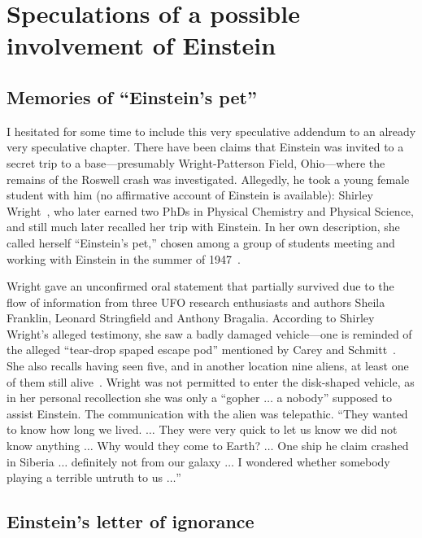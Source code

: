 \section{Speculations of a possible involvement of Einstein}
\label{2023-UFO-part-Perception-crash-retreivals-einstein}

\subsection{Memories of ``Einstein's pet''}

I hesitated for some time to include this very speculative addendum to an already very speculative chapter.
There have been claims that Einstein was invited to a secret trip to a base---presumably Wright-Patterson Field, Ohio---where
the remains of the Roswell crash was investigated.
Allegedly, he took a young female student with him (no affirmative account of Einstein is available):
Shirley Wright~\cite{ShirleyWrightObituaryLegacy2015Jul}, who later earned two PhDs in Physical Chemistry and Physical Science,
and still much later recalled her trip with Einstein.
In her own description, she
called herself ``Einstein's pet,''
chosen among a group of students meeting and working with Einstein in the summer of 1947~\cite{BragaliaEinstein}.

Wright gave an unconfirmed oral statement that partially survived due to the flow of information from three UFO research enthusiasts and authors
Sheila Franklin, Leonard Stringfield and Anthony Bragalia.
According to Shirley Wright's alleged testimony, she saw a badly damaged vehicle---one is reminded of the alleged
``tear-drop spaped escape pod'' mentioned by Carey and Schmitt~\cite{CareySchmitt}.
She also recalls having seen five, and in another location nine aliens, at least one of them still alive~\cite{BragaliaEinstein}.
Wright was not permitted to enter the disk-shaped vehicle, as in her personal recollection she was only a
``gopher $\ldots$ a nobody''
supposed to assist Einstein.
The communication with the alien was telepathic. ``They wanted to know how long we lived. $\ldots$ They were very quick to let us know we did not know anything
$\ldots$ Why would they come to Earth? $\ldots$ One ship he claim crashed in Siberia $\ldots$ definitely not from our galaxy $\ldots$
I wondered whether somebody playing a terrible untruth to us $\ldots$''

\subsection{Einstein's letter of ignorance}

